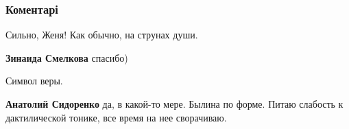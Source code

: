  
 
 
 
 
\subsubsection{Коментарі}

\begin{itemize}
 
Сильно, Женя! Как обычно, на струнах души.

\begin{itemize}
 
\textbf{Зинаида Смелкова} спасибо)
\end{itemize}

 
Символ веры.

\begin{itemize}
 
\textbf{Анатолий Сидоренко} да, в какой-то мере. Былина по форме. Питаю слабость к дактилической тонике, все время на нее сворачиваю.
\end{itemize}

 

\end{itemize}
